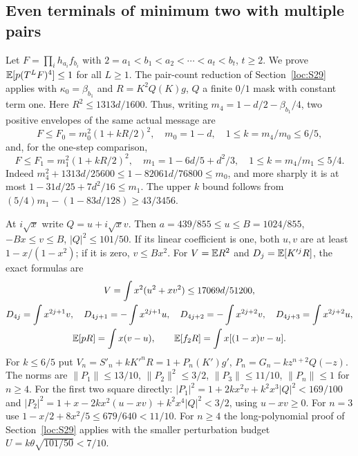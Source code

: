 \subsection{Even terminals of minimum two with multiple pairs}\label{loc:S33}
Let $F=\prod_{i} h_{a_i}f_{b_i}$ with
$2=a_1<b_1<a_2<\cdots<a_t<b_t$, $t\ge2$.
We prove $\mathbb E[p(T^LF)^4]\le1$ for all $L\ge1$.
The pair-count reduction of Section~\ref{loc:S29} applies with
$\kappa_0=\beta_{b_1}$ and $R=K^2Q(K)g$, $Q$ a finite $0/1$ mask
with constant term one. Here $R^2\le1313d/1600$.
Thus, writing $m_4=1-d/2-\beta_{b_1}/4$, two positive envelopes of
the same actual message are
\[
 F\le F_0=m_0^2(1+kR/2)^2,\quad m_0=1-d,\quad1\le k=m_4/m_0\le6/5,
\]
and, for the one-step comparison,
\[
 F\le F_1=m_1^2(1+kR/2)^2,\quad m_1=1-6d/5+d^2/3,
 \quad1\le k=m_4/m_1\le5/4.
\]
Indeed $m_4^2+1313d/25600\le1-82061d/76800\le m_0$,
and more sharply it is at most $1-31d/25+7d^2/16\le m_1$.
The upper $k$ bound follows from
$(5/4)m_1-(1-83d/128)\ge43/3456$.

At $i\sqrt x$ write $Q=u+i\sqrt xv$.
Then $a=439/855\le u\le B=1024/855$,
$-Bx\le v\le B$, $|Q|^2\le101/50$.
If its linear coefficient is one, both $u,v$ are at least
$1-x/(1-x^2)$; if it is zero, $v\le Bx^2$.
For $V=\mathbb E R^2$ and $D_j=\mathbb E[K'^jR]$, the exact formulas are
\begin{gather*}
 V=\int x^2(u^2+xv^2)\le17069d/51200,\\
 D_{4j}=\int x^{2j+1}v,\quad D_{4j+1}=-\int x^{2j+1}u,\quad
 D_{4j+2}=-\int x^{2j+2}v,\quad D_{4j+3}=\int x^{2j+2}u,\\
 \mathbb E[pR]=\int x(v-u),\qquad\mathbb E[f_2R]=\int x[(1-x)v-u].
\end{gather*}
For $k\le6/5$ put $V_n=S'_n+kK'^nR=1+P_n(K')g'$,
$P_n=G_n-kz^{n+2}Q(-z)$.
The norms are $\|P_1\|\le13/10$, $\|P_2\|^2\le3/2$,
$\|P_3\|\le11/10$, $\|P_n\|\le1$ for $n\ge4$.
For the first two square directly:
$|P_1|^2=1+2kx^2v+k^2x^3|Q|^2<169/100$ and
$|P_2|^2=1+x-2kx^2(u-xv)+k^2x^4|Q|^2<3/2$,
using $u-xv\ge0$. For $n=3$ use
$1-x/2+8x^2/5\le679/640<11/10$.
For $n\ge4$ the long-polynomial proof of Section~\ref{loc:S29}
applies with the smaller perturbation budget
$U=k\theta\sqrt{101/50}<7/10$.

